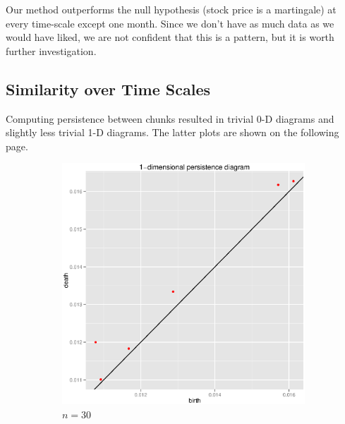 \documentclass{article}
\begin{document}
Our method outperforms the null hypothesis (stock price is a martingale) at every time-scale except one month. Since we don’t have as much data as we would have liked, we are not confident that this is a pattern, but it is worth further investigation.

\subsection{Similarity over Time Scales}
Computing persistence between chunks resulted in trivial 0-D diagrams and slightly less trivial 1-D diagrams. The latter plots are shown on the following page.

\newpage

\begin{figure}
\centering
\begin{subfigure}[htbp]{0.49 \textwidth}
\includegraphics[width = \linewidth]{psqplots/p2-1-90}
\caption{$n = 30$}
\label{p2-1-30}
\end{subfigure}
~
\begin{subfigure}[htbp]{0.49 \textwidth}

\end{subfigure}
\end{figure}
\end{document}
